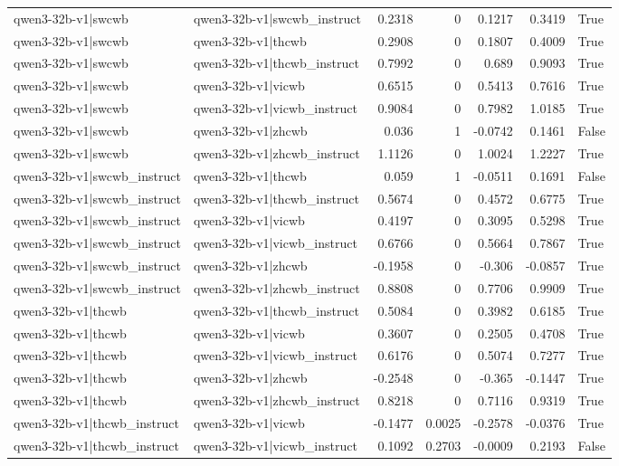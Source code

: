 \begin{table}
\begin{tabular}{l l r r r r l}
qwen3-32b-v1|swcwb & qwen3-32b-v1|swcwb_instruct & 0.2318 & 0 & 0.1217 & 0.3419 & True \\
qwen3-32b-v1|swcwb & qwen3-32b-v1|thcwb & 0.2908 & 0 & 0.1807 & 0.4009 & True \\
qwen3-32b-v1|swcwb & qwen3-32b-v1|thcwb_instruct & 0.7992 & 0 & 0.689 & 0.9093 & True \\
qwen3-32b-v1|swcwb & qwen3-32b-v1|vicwb & 0.6515 & 0 & 0.5413 & 0.7616 & True \\
qwen3-32b-v1|swcwb & qwen3-32b-v1|vicwb_instruct & 0.9084 & 0 & 0.7982 & 1.0185 & True \\
qwen3-32b-v1|swcwb & qwen3-32b-v1|zhcwb & 0.036 & 1 & -0.0742 & 0.1461 & False \\
qwen3-32b-v1|swcwb & qwen3-32b-v1|zhcwb_instruct & 1.1126 & 0 & 1.0024 & 1.2227 & True \\
qwen3-32b-v1|swcwb_instruct & qwen3-32b-v1|thcwb & 0.059 & 1 & -0.0511 & 0.1691 & False \\
qwen3-32b-v1|swcwb_instruct & qwen3-32b-v1|thcwb_instruct & 0.5674 & 0 & 0.4572 & 0.6775 & True \\
qwen3-32b-v1|swcwb_instruct & qwen3-32b-v1|vicwb & 0.4197 & 0 & 0.3095 & 0.5298 & True \\
qwen3-32b-v1|swcwb_instruct & qwen3-32b-v1|vicwb_instruct & 0.6766 & 0 & 0.5664 & 0.7867 & True \\
qwen3-32b-v1|swcwb_instruct & qwen3-32b-v1|zhcwb & -0.1958 & 0 & -0.306 & -0.0857 & True \\
qwen3-32b-v1|swcwb_instruct & qwen3-32b-v1|zhcwb_instruct & 0.8808 & 0 & 0.7706 & 0.9909 & True \\
qwen3-32b-v1|thcwb & qwen3-32b-v1|thcwb_instruct & 0.5084 & 0 & 0.3982 & 0.6185 & True \\
qwen3-32b-v1|thcwb & qwen3-32b-v1|vicwb & 0.3607 & 0 & 0.2505 & 0.4708 & True \\
qwen3-32b-v1|thcwb & qwen3-32b-v1|vicwb_instruct & 0.6176 & 0 & 0.5074 & 0.7277 & True \\
qwen3-32b-v1|thcwb & qwen3-32b-v1|zhcwb & -0.2548 & 0 & -0.365 & -0.1447 & True \\
qwen3-32b-v1|thcwb & qwen3-32b-v1|zhcwb_instruct & 0.8218 & 0 & 0.7116 & 0.9319 & True \\
qwen3-32b-v1|thcwb_instruct & qwen3-32b-v1|vicwb & -0.1477 & 0.0025 & -0.2578 & -0.0376 & True \\
qwen3-32b-v1|thcwb_instruct & qwen3-32b-v1|vicwb_instruct & 0.1092 & 0.2703 & -0.0009 & 0.2193 & False \\

\end{tabular}
\end{table}
